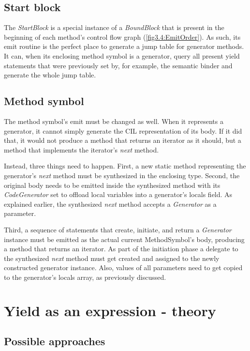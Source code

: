 \subsection{Start block}\label{StartBlock}

The \emph{StartBlock} is a special instance of a \emph{BoundBlock} that is present in the beginning of each method’s control flow graph (\autoref{fig3.4:EmitOrder}). As such, its emit routine is the perfect place to generate a jump table for generator methods. It can, when its enclosing method symbol is a generator, query all present yield statements that were previously set by, for example, the semantic binder and generate the whole jump table.

\subsection{Method symbol}

The method symbol’s emit must be changed as well. When it represents a generator, it cannot simply generate the CIL representation of its body. If it did that, it would not produce a method that returns an iterator as it should, but a method that implements the iterator’s \emph{next} method.

Instead, three things need to happen. First, a new static method representing the generator’s \emph{next} method must be synthesized in the enclosing type. Second, the original body needs to be emitted inside the synthesized method with its \emph{CodeGenerator} set to offload local variables into a generator’s locals field. As explained earlier, the synthesized \emph{next} method accepts a \emph{Generator} as a parameter.

Third, a sequence of statements that create, initiate, and return a \emph{Generator} instance must be emitted as the actual current MethodSymbol’s body, producing a method that returns an iterator. As part of the initiation phase a delegate to the synthesized \emph{next} method must get created and assigned to the newly constructed generator instance. Also, values of all parameters need to get copied to the generator’s locals array, as previously discussed.

\section{Yield as an expression - theory}

\subsection{Possible approaches}

